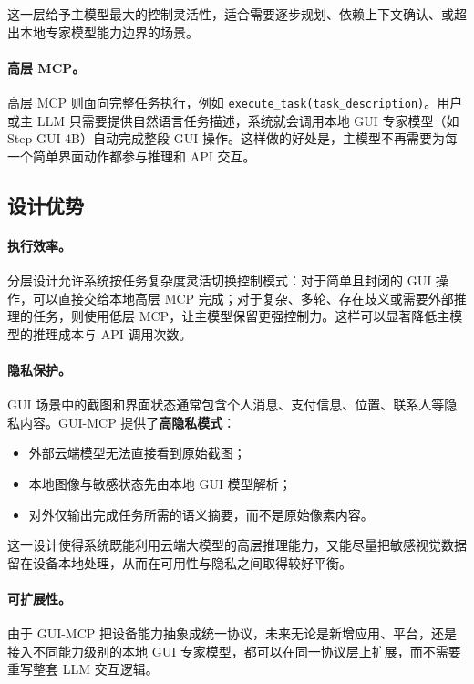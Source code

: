 这一层给予主模型最大的控制灵活性，适合需要逐步规划、依赖上下文确认、或超出本地专家模型能力边界的场景。

\paragraph{高层 MCP。}
高层 MCP 则面向完整任务执行，例如 \texttt{execute\_task(task\_description)}。用户或主 LLM 只需要提供自然语言任务描述，系统就会调用本地 GUI 专家模型（如 Step-GUI-4B）自动完成整段 GUI 操作。这样做的好处是，主模型不再需要为每一个简单界面动作都参与推理和 API 交互。

\subsection{设计优势}

\paragraph{执行效率。}
分层设计允许系统按任务复杂度灵活切换控制模式：对于简单且封闭的 GUI 操作，可以直接交给本地高层 MCP 完成；对于复杂、多轮、存在歧义或需要外部推理的任务，则使用低层 MCP，让主模型保留更强控制力。这样可以显著降低主模型的推理成本与 API 调用次数。

\paragraph{隐私保护。}
GUI 场景中的截图和界面状态通常包含个人消息、支付信息、位置、联系人等隐私内容。GUI-MCP 提供了\textbf{高隐私模式}：
\begin{itemize}
\item 外部云端模型无法直接看到原始截图；
\item 本地图像与敏感状态先由本地 GUI 模型解析；
\item 对外仅输出完成任务所需的语义摘要，而不是原始像素内容。
\end{itemize}

这一设计使得系统既能利用云端大模型的高层推理能力，又能尽量把敏感视觉数据留在设备本地处理，从而在可用性与隐私之间取得较好平衡。

\paragraph{可扩展性。}
由于 GUI-MCP 把设备能力抽象成统一协议，未来无论是新增应用、平台，还是接入不同能力级别的本地 GUI 专家模型，都可以在同一协议层上扩展，而不需要重写整套 LLM 交互逻辑。
